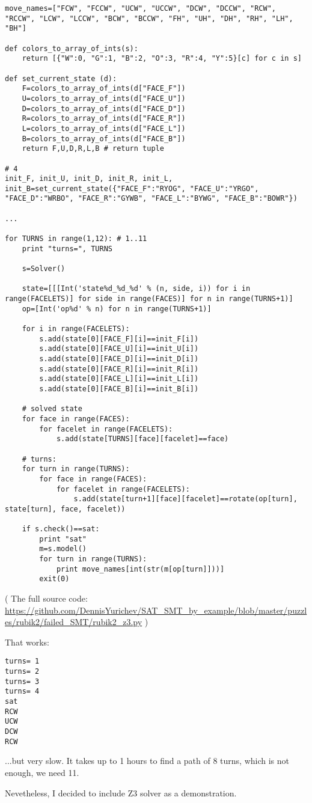 \begin{lstlisting}
move_names=["FCW", "FCCW", "UCW", "UCCW", "DCW", "DCCW", "RCW", "RCCW", "LCW", "LCCW", "BCW", "BCCW", "FH", "UH", "DH", "RH", "LH", "BH"]

def colors_to_array_of_ints(s):
    return [{"W":0, "G":1, "B":2, "O":3, "R":4, "Y":5}[c] for c in s]

def set_current_state (d):
    F=colors_to_array_of_ints(d["FACE_F"])
    U=colors_to_array_of_ints(d["FACE_U"])
    D=colors_to_array_of_ints(d["FACE_D"])
    R=colors_to_array_of_ints(d["FACE_R"])
    L=colors_to_array_of_ints(d["FACE_L"])
    B=colors_to_array_of_ints(d["FACE_B"])
    return F,U,D,R,L,B # return tuple

# 4
init_F, init_U, init_D, init_R, init_L, init_B=set_current_state({"FACE_F":"RYOG", "FACE_U":"YRGO", "FACE_D":"WRBO", "FACE_R":"GYWB", "FACE_L":"BYWG", "FACE_B":"BOWR"})

...

for TURNS in range(1,12): # 1..11
    print "turns=", TURNS

    s=Solver()

    state=[[[Int('state%d_%d_%d' % (n, side, i)) for i in range(FACELETS)] for side in range(FACES)] for n in range(TURNS+1)]
    op=[Int('op%d' % n) for n in range(TURNS+1)]

    for i in range(FACELETS):
        s.add(state[0][FACE_F][i]==init_F[i])
        s.add(state[0][FACE_U][i]==init_U[i])
        s.add(state[0][FACE_D][i]==init_D[i])
        s.add(state[0][FACE_R][i]==init_R[i])
        s.add(state[0][FACE_L][i]==init_L[i])
        s.add(state[0][FACE_B][i]==init_B[i])

    # solved state
    for face in range(FACES):
        for facelet in range(FACELETS):
            s.add(state[TURNS][face][facelet]==face)

    # turns:
    for turn in range(TURNS):
        for face in range(FACES):
            for facelet in range(FACELETS):
                s.add(state[turn+1][face][facelet]==rotate(op[turn], state[turn], face, facelet))

    if s.check()==sat:
        print "sat"
        m=s.model()
        for turn in range(TURNS):
            print move_names[int(str(m[op[turn]]))]
        exit(0)
\end{lstlisting}

( The full source code: \url{https://github.com/DennisYurichev/SAT_SMT_by_example/blob/master/puzzles/rubik2/failed_SMT/rubik2_z3.py} )

That works:

\begin{lstlisting}
turns= 1
turns= 2
turns= 3
turns= 4
sat
RCW
UCW
DCW
RCW
\end{lstlisting}

...but very slow. It takes up to 1 hours to find a path of 8 turns, which is not enough, we need 11.

Nevetheless, I decided to include Z3 solver as a demonstration.


